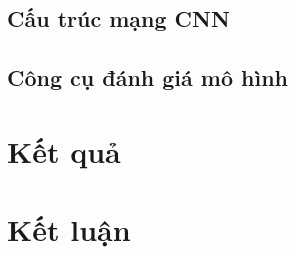 \documentclass[12pt,a4paper]{article}
\begin{document}
	\subsection{Cấu trúc mạng CNN}
	
	\subsection{Công cụ đánh giá mô hình}
	
	
	\section{Kết quả}
	
	
	\section{Kết luận}
\end{document}
